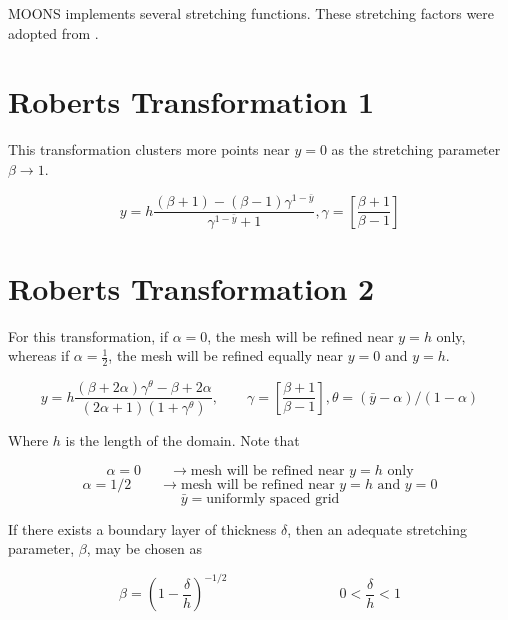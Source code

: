 \documentclass[11pt]{article}
\newcommand{\gammadef}{\left[\frac{\beta+1}{\beta-1}\right]}
\newcommand{\g}{\gamma}
\begin{document}
\doublespacing
\MOONSTITLE
\maketitle

MOONS implements several stretching functions. These stretching factors were adopted from \cite{pletcher2012computational}.

\section{Roberts Transformation 1}

This transformation clusters more points near $y=0$ as the stretching parameter $\beta \rightarrow 1$.

\begin{equation}
	y = h \frac{(\beta+1)-(\beta-1) \g^{1-\bar{y}} } {\g^{1-\bar{y}}+1}, \g = \gammadef
\end{equation}

\section{Roberts Transformation 2}
For this transformation, if $\alpha=0$, the mesh will be refined near $y=h$ only, whereas if $\alpha= \frac{1}{2}$, the mesh will be refined equally near $y=0$ and $y=h$.

\begin{equation} \label{eq:T2}
	y = h \frac{ (\beta + 2 \alpha) \g^{\theta} - \beta + 2 \alpha}
	{ (2\alpha+1) \left(1+\g^{\theta} \right) }
	, \qquad \g = \gammadef, \theta = (\bar{y}-\alpha)/(1-\alpha)
\end{equation}

Where $h$ is the length of the domain. Note that

\begin{equation}
	\alpha = 0 \qquad \rightarrow \text{mesh will be refined near $y=h$ only}
\end{equation}
\begin{equation}
	\alpha = 1/2 \qquad \rightarrow \text{mesh will be refined near $y=h$ and $y=0$}
\end{equation}
\begin{equation}
	\bar{y} = \text{uniformly spaced grid}
\end{equation}

If there exists a boundary layer of thickness $\delta$, then an adequate stretching parameter, $\beta$, may be chosen as

\begin{equation}
	\beta = \left( 1 - \frac{\delta}{h} \right)^{-1/2}
	\qquad \qquad
	\qquad \qquad
	0 < \frac{\delta}{h} < 1
\end{equation}
\end{document}
